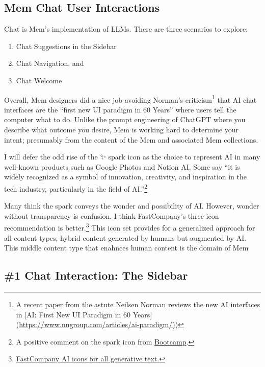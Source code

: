 \documentclass[]{tufte-handout}
\begin{document}
\hypertarget{mem-chat-user-interactions}{%
\subsection{Mem Chat User
Interactions}\label{mem-chat-user-interactions}}

Chat is Mem's implementation of LLMs. There are three scenarios to
explore:

\begin{enumerate}
\def\labelenumi{\arabic{enumi}.}
\item
  Chat Suggestions in the Sidebar
\item
  Chat Navigation, and
\item
  Chat Welcome
\end{enumerate}

Overall, Mem designers did a nice job avoiding Norman's
criticism\footnote{A recent paper from the astute Neilsen Norman reviews
  the new AI interfaces in {[}AI: First New UI Paradigm in 60 Years{]}
  (\href{https://www.nngroup.com/articles/ai-paradigm/}{https://www.nngroup.com/articles/ai-paradigm/)})}
that AI chat interfaces are the ``first new UI paradigm in 60 Years''
where users tell the computer what to do. Unlike the prompt engineering
of ChatGPT where you describe what outcome you desire, Mem is working
hard to determine your intent; presumably from the content of the Mem
and associated Mem collections.

I will defer the odd rise of the ✨ spark icon as the choice to
represent AI in many well-known products such as Google Photos and
Notion AI. Some say ``it is widely recognized as a symbol of innovation,
creativity, and inspiration in the tech industry, particularly in the
field of AI.''\footnote{A positive comment on the spark icon from
  \href{https://bootcamp.uxdesign.cc/the-unstoppable-rise-of-spark-as-ais-iconic-symbol-ca663162cccc}{Bootcamp}.}

Many think the spark conveys the wonder and possibility of AI. However,
wonder without transparency is confusion. I think FastCompany's three
icon recommendation is better.\footnote{\href{https://www.fastcompany.com/90903238/simple-icon-it-easy-to-spot-ai-generated-content}{FastCompany
  AI icons for all generative text.}} This icon set provides for a
generalized approach for all content types, hybrid content generated by
humans but augmented by AI. This middle content type that enahnces human
content is the domain of Mem

\hypertarget{chat-interaction-the-sidebar}{%
\subsection{\#1 Chat Interaction: The
Sidebar}\label{chat-interaction-the-sidebar}}
\end{document}
